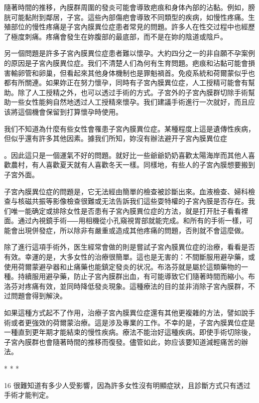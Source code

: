 \documentclass[12pt,UTF8]{ctexbook}
\begin{document}
隨著時間的推移，內膜群周圍的發炎可能會導致疤痕和身体內部的沾黏。例如，膀胱可能黏附到鄰居，子宮。這些內部傷疤會導致不同類型的疾病，如慢性疼痛。生殖部位的慢性疼痛是子宮內膜異位症患者常見的問題。許多人在性交过程中也經歷了極度刺痛。疼痛會發生在妳腹部的最底部，而不是在妳的陰道或陰戶。

另一個問題是許多子宮內膜異位症患者難以懷孕。大約四分之一的非自願不孕案例的原因是子宮內膜異位症。我们不清楚人们為何有生育問題。疤痕和沾黏可能會損害輸卵管和卵巢，但看起來其他身体機制也是罪魁禍首。免疫系統和荷爾蒙似乎也都有所關連。如果妳正在努力懷孕，同時有子宮內膜異位症，人工授精可能會有幫助。除了人工授精之外，也可以透过手術的方式。子宮外的子宮內膜群切除手術幫助一些女性能夠自然地透过人工授精來懷孕。我们建議手術進行一次就好，而且应该將這個機會保留到打算懷孕時使用。

我们不知道為什麼有些女性會罹患子宮內膜異位症。某種程度上這是遺傳性疾病，但似乎還有許多其他因素。據我们所知，妳沒有辦法避开子宮內膜異位症

。因此這只是一個運氣不好的問題。就好比一些爺爺奶奶喜歡太陽海岸而其他人喜歡農村，有人喜歡夏天就有人喜歡冬天一樣。同樣地，有些人的子宮內膜想要搬到子宮外面。

子宮內膜異位症的問題是，它无法經由簡單的檢查被診斷出來。血液檢查、婦科檢查与核磁共振等影像檢查很難或无法告訴我们這些耍特權的子宮內膜是否存在。我们唯一能确定或排除女性是否患有子宮內膜異位症的方法，就是打开肚子看看裡面。通过內視鏡手術⸺用相機從小孔窺視胃部就能完成。和所有的手術一樣，可能會出現併發症，所以除非有嚴重或造成其他疼痛的問題，否則就不會這麼做。

除了進行這項手術外，医生經常會做的則是嘗試子宮內膜異位症的治療，看看是否有效。幸運的是，大多女性的治療很簡單。這也是无害的：不間斷服用避孕藥，或使用荷爾蒙避孕器和止痛藥也能鎮定發炎的状况。布洛芬就是屬於這類藥物的一種。持續服用避孕藥，防止子宮內膜群出血，有可能導致它们隨著時間而縮小。布洛芬对疼痛有效，並同時降低發炎現象。這種療法的目的並非消除子宮內膜群，不过問題會得到解決。

如果這種方式起不了作用，治療子宮內膜異位症還有其他更複雜的方法，譬如說手術或者更強效的荷爾蒙治療。這是涉及專業的工作。不幸的是，子宮內膜異位症是一種直到更年期才能結束的慢性疾病。療法不能治好這種疾病。即使手術切除後，子宮內膜群也會隨著時間的推移而復發。儘管如此，妳应该要知道減輕痛苦的辦法。





* * *



16	很難知道有多少人受影響，因為許多女性沒有明顯症狀，且診斷方式只有透过手術才能判定。
\end{document}
